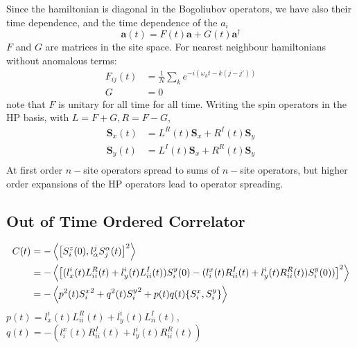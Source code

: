 \documentclass{article}
\let\vec\bm
\begin{document}
Since the hamiltonian is diagonal in the Bogoliubov operators, we have also their time dependence, and the time dependence of the $a_i$
\begin{equation}
    \vec{a}(t) = F(t) \vec{a} + G(t) \vec{a}^\dagger
\end{equation}
$F$ and $G$ are matrices in the site space. 
For nearest neighbour hamiltonians without anomalous terms: 
\begin{align}
    F_{ij}(t)&= \frac{1}{N} \sum_k e^{-i(\omega_k t - k(j-j'))}\\
    G &= 0
\end{align}
note that $F$ is unitary for all time for all time. 
Writing the spin operators in the HP basis, with $L = F+G, R=F-G$,
\begin{align}
    \vec{S}_x(t) &= L^R(t)\vec{S}_x + R^I(t)\vec{S}_y\\
    \vec{S}_y(t) &= L^I(t)\vec{S}_x + R^R(t)\vec{S}_y\\
\end{align}
At first order $n-$site operators spread to sums of $n-$site operators, but higher order expansions of the HP operators lead to operator spreading.
%
\subsection{Out of Time Ordered Correlator}
%
\begin{align}
    C(t) &= -\ev{\comm{S_i^z(0)}{l^j_\alpha S_j^\alpha(t)}^2}\\
         &= -\ev{\left[(l^i_x(t) L^R_{ii}(t)+ l^i_y(t) L^I_{ii}(t)) S_i^y(0)-(l_i^x(t)R^I_{ii}(t) + l^i_y(t) R^R_{ii}(t))S_i^y(0))\right]^2}\\
         &= -\ev{p^2(t){S_i^x}^2+q^2(t){S_i^y}^2 + p(t)q(t)\acomm{S_i^x}{S_i^y}}
\end{align}
$p(t) = l^i_x(t) L^R_{ii}(t)+ l^i_y(t) L^I_{ii}(t)$, $q(t) =-(l_i^x(t)R^I_{ii}(t) + l^i_y(t) R^R_{ii}(t))$



\end{document}
